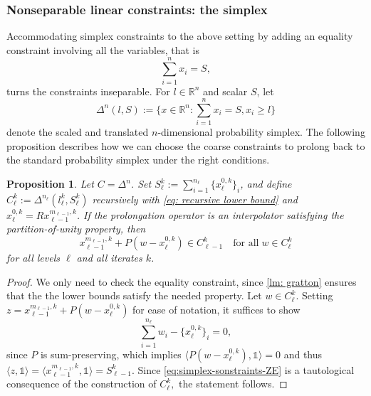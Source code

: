 \documentclass[11pt,reqno]{amsart}
\numberwithin{equation}{section}
\numberwithin{figure}{section}
\theoremstyle{plain}
\newtheorem{proposition}[theorem]{Proposition}
\theoremstyle{definition}
\newcommand{\R}{\mathbb{R}}
\newcommand{\la}{\langle}
\newcommand{\ra}{\rangle}
\newcommand{\eins}{\mathbb{1}}
\begin{document}
\subsubsection{Nonseparable linear constraints: the simplex}
Accommodating simplex constraints to the above setting by adding an equality constraint involving all the variables, that is
\begin{equation}
    \sum_{i = 1}^n x_i = S,
\end{equation}
turns the constraints inseparable. For $l \in \R^n$ and scalar $S$, let \begin{equation}
    \Delta^{n}(l,S) := \{ x \in \R^{n}: \sum_{i = 1}^{n} x_i = S, x_i \geq l \}
\end{equation}
denote the scaled and translated $n$-dimensional probability simplex. The following proposition describes how we can choose the coarse constraints to prolong back to the standard probability simplex under the right conditions.
\begin{proposition} \label{prop:criticality-consistency-simplex}
    Let $C = \Delta^n$. Set $S_\ell^k:= \sum_{i = 1}^{n_\ell} \{x^{0,k}_\ell\}_i$, and define $C_\ell^k := \Delta^{n_\ell}(l^k_\ell, S_\ell^k)$ recursively with \eqref{eq: recursive lower bound} and $x_\ell^{0,k}=Rx_{\ell-1}^{m_{\ell-1},k}$. If the prolongation operator is an interpolator satisfying the partition-of-unity property, then 
    \begin{equation}
        x_{\ell-1}^{m_{\ell-1}, k} + P(w - x_{\ell}^{0,k}) \in C_{\ell-1}^k \quad \text{for all} \; w \in C_{\ell}^k
    \end{equation}
    for all levels $\ell$ and all iterates $k$.
\end{proposition}
\begin{proof}
    We only need to check the equality constraint, since \cref{lm: gratton} ensures that the the lower bounds satisfy the needed property. Let $w \in C_\ell^k$. Setting $z = x_{\ell-1}^{m_{\ell-1}, k} + P(w - x_{\ell}^{0,k})$ for ease of notation, it suffices to show
    \begin{equation} \label{eq:simplex-sonstraints-ZE}
        \sum_{i = 1}^{n_\ell} w_i - \{x_\ell^{0,k}\}_i = 0,
    \end{equation}
    since $P$ is sum-preserving, which implies $\la  P(w - x_{\ell}^{0,k}), \eins \ra = 0$ and thus $\la z, \eins \ra = \la x_{\ell-1}^{m_{\ell-1}, k}, \eins \ra \allowbreak = S_{\ell - 1}^k$. Since \eqref{eq:simplex-sonstraints-ZE} is a tautological consequence of the construction of $C_\ell^k,$  the statement follows.  
\end{proof}
\end{document}
